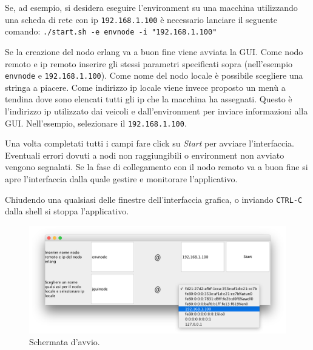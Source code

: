 \documentclass{memoir}
\begin{document}
Se, ad esempio, si desidera eseguire l'environment su una macchina utilizzando
una scheda di rete con ip \texttt{192.168.1.100} è necessario lanciare il
seguente comando: \texttt{./start.sh -e envnode -i "192.168.1.100"}

Se la creazione del nodo erlang va a buon fine viene avviata la GUI. Come nodo
remoto e ip remoto inserire gli stessi parametri specificati sopra (nell'esempio
\texttt{envnode} e \texttt{192.168.1.100}). Come nome del nodo locale è
possibile scegliere una stringa a piacere. Come indirizzo ip locale viene invece
proposto un menù a tendina dove sono elencati tutti gli ip che la macchina ha
assegnati. Questo è l'indirizzo ip utilizzato dai veicoli e dall'environment per
inviare informazioni alla GUI. Nell'esempio, selezionare il
\texttt{192.168.1.100}.

Una volta completati tutti i campi fare click su \emph{Start} per avviare
l'interfaccia. Eventuali errori dovuti a nodi non raggiungibili o environment
non avviato vengono segnalati. Se la fase di collegamento con il nodo remoto va
a buon fine si apre l'interfaccia dalla quale gestire e monitorare
l'applicativo.

Chiudendo una qualsiasi delle finestre dell'interfaccia grafica, o inviando
\texttt{CTRL-C} dalla shell si stoppa l'applicativo.

\begin{figure}
\centering
\includegraphics[width=\textwidth]{guisetup}
\caption{Schermata d'avvio.}
\end{figure}

\end{document}
